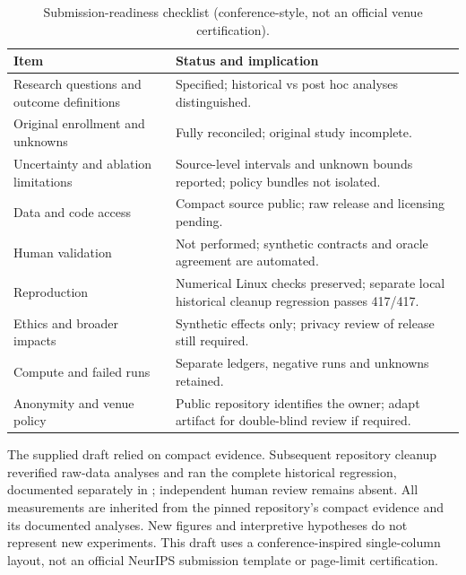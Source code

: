 \documentclass[10pt]{article}
\begin{document}
\begin{table}[H]\small\centering\caption{Submission-readiness checklist (conference-style, not an official venue certification).}\label{tab:check}
\begin{tabularx}{\linewidth}{@{}p{.37\linewidth}X@{}}\toprule
Item & Status and implication\\\midrule
Research questions and outcome definitions & Specified; historical vs post hoc analyses distinguished.\\
Original enrollment and unknowns & Fully reconciled; original study incomplete.\\
Uncertainty and ablation limitations & Source-level intervals and unknown bounds reported; policy bundles not isolated.\\
Data and code access & Compact source public; raw release and licensing pending.\\
Human validation & Not performed; synthetic contracts and oracle agreement are automated.\\
Reproduction & Numerical Linux checks preserved; separate local historical cleanup regression passes 417/417.\\
Ethics and broader impacts & Synthetic effects only; privacy review of release still required.\\
Compute and failed runs & Separate ledgers, negative runs and unknowns retained.\\
Anonymity and venue policy & Public repository identifies the owner; adapt artifact for double-blind review if required.\\\bottomrule
\end{tabularx}\end{table}
The supplied draft relied on compact evidence. Subsequent repository cleanup reverified raw-data analyses and ran the complete historical regression, documented separately in ; independent human review remains absent. All measurements are inherited from the pinned repository's compact evidence and its documented analyses. New figures and interpretive hypotheses do not represent new experiments. This draft uses a conference-inspired single-column layout, not an official NeurIPS submission template or page-limit certification.
\end{document}
